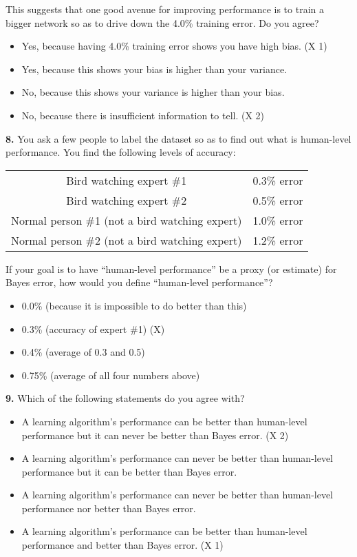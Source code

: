 This suggests that one good avenue for improving performance is to train a bigger network so as to drive down the 4.0\% training error. Do you agree?
\begin{itemize}
    \item Yes, because having 4.0\% training error shows you have high bias. (X 1)
    \item Yes, because this shows your bias is higher than your variance.
    \item No, because this shows your variance is higher than your bias.
    \item No, because there is insufficient information to tell. (X 2)
\end{itemize}
\textbf{8.} You ask a few people to label the dataset so as to find out what is human-level performance. You find the following levels of accuracy:
\begin{center}
\begin{tabular}{ |c|c| }
 \hline
 Bird watching expert \#1 & 0.3\% error \\
 Bird watching expert \#2 & 0.5\% error \\
 Normal person \#1 (not a bird watching expert) & 1.0\% error \\
 Normal person \#2 (not a bird watching expert) & 1.2\% error \\
 \hline
\end{tabular}
\end{center}
If your goal is to have “human-level performance” be a proxy (or estimate) for Bayes error, how would you define “human-level performance”?
\begin{itemize}
    \item 0.0\% (because it is impossible to do better than this)
    \item 0.3\% (accuracy of expert \#1) (X)
    \item 0.4\% (average of 0.3 and 0.5)
    \item 0.75\% (average of all four numbers above)
\end{itemize}
\textbf{9.} Which of the following statements do you agree with?
\begin{itemize}
    \item A learning algorithm’s performance can be better than human-level performance but it can never be better than Bayes error. (X 2)
    \item A learning algorithm’s performance can never be better than human-level performance but it can be better than Bayes error.
    \item A learning algorithm’s performance can never be better than human-level performance nor better than Bayes error.
    \item A learning algorithm’s performance can be better than human-level performance and better than Bayes error. (X 1)
\end{itemize}
